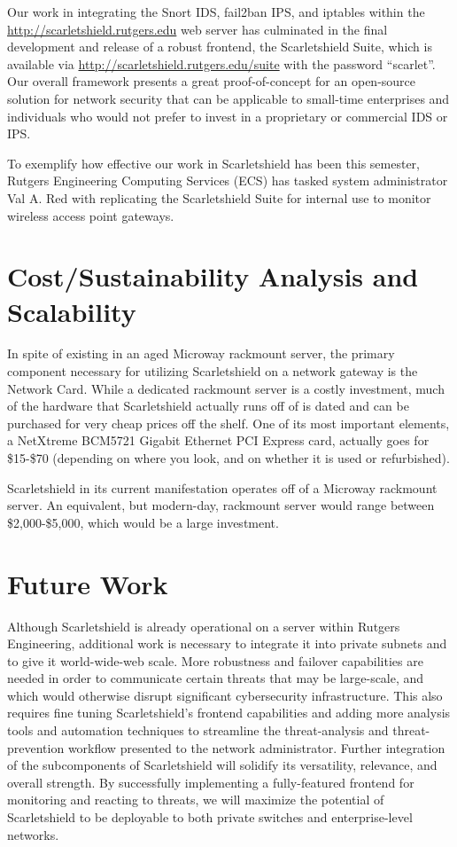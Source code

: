 \documentclass[12pt,letterpaper,titlepage]{report}
\begin{document}
{Our work in integrating the Snort IDS, fail2ban IPS, and iptables within the 
\url{http://scarletshield.rutgers.edu} web server has culminated in the final 
development and release of a robust frontend, the Scarletshield Suite, which is
available via \url{http://scarletshield.rutgers.edu/suite} with the password 
“scarlet”. Our overall framework presents a great proof-of-concept for an open-source
solution for network security that can be applicable to small-time enterprises and
individuals who would not prefer to invest in a proprietary or commercial IDS or IPS. 

To exemplify how effective our work in Scarletshield has been this semester, 
Rutgers Engineering Computing Services (ECS) has tasked system administrator 
Val A. Red with replicating the Scarletshield Suite for internal use to monitor 
wireless access point gateways. 

\section{Cost/Sustainability Analysis and Scalability}

In spite of existing in an aged Microway rackmount server, the primary component 
necessary for utilizing Scarletshield on a network gateway is the Network Card.  While a 
dedicated rackmount server is a costly investment, much of the hardware that 
Scarletshield actually runs off of is dated and can be purchased for very 
cheap prices off the shelf.  One of its most important elements, a NetXtreme 
BCM5721 Gigabit Ethernet PCI Express card, actually goes for \$15-\$70 (depending 
on where you look, and on whether it is used or refurbished). 

Scarletshield in its current manifestation operates off of a Microway rackmount 
server.  An equivalent, but modern-day, rackmount server would range between 
\$2,000-\$5,000, which would be a large investment. 

\section{Future Work}

Although Scarletshield is already operational on a server within Rutgers
Engineering, additional work is necessary to integrate it into private subnets
and to give it world-wide-web scale. More robustness and failover capabilities
are needed in order to communicate certain threats that may be large-scale, and
which would otherwise disrupt significant cybersecurity infrastructure. This
also requires fine tuning Scarletshield’s frontend capabilities and adding more
analysis tools and automation techniques to streamline the threat-analysis and
threat-prevention workflow presented to the network administrator.  Further
integration of the subcomponents of Scarletshield will solidify its versatility,
relevance, and overall strength.  By successfully implementing a fully-featured
frontend for monitoring and reacting to threats, we will maximize the potential
of Scarletshield to be deployable to both private switches and enterprise-level
networks.

}
\end{document}
